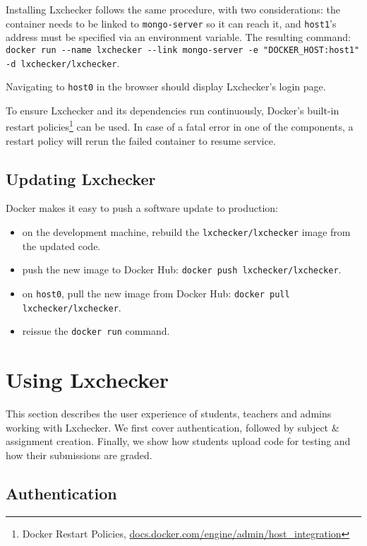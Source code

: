 Installing Lxchecker follows the same procedure, with two considerations: the container needs to be linked to \texttt{mongo-server} so it can reach it, and \texttt{host1}'s address must be specified via an environment variable. The resulting command: \texttt{docker run -{}-name lxchecker -{}-link mongo-server -e "DOCKER_HOST:host1" -d lxchecker/lxchecker}.

Navigating to \texttt{host0} in the browser should display Lxchecker's login page.

To ensure Lxchecker and its dependencies run continuously, Docker's built-in restart policies\footnote{Docker Restart Policies, \url{docs.docker.com/engine/admin/host_integration}} can be used. In case of a fatal error in one of the components, a restart policy will rerun the failed container to resume service.

\subsection{Updating Lxchecker}
\label{sub-sec:update-lxchecker}

Docker makes it easy to push a software update to production:
\begin{itemize}
	\item on the development machine, rebuild the \texttt{lxchecker/lxchecker} image from the updated code.
	\item push the new image to Docker Hub: \texttt{docker push lxchecker/lxchecker}.
	\item on \texttt{host0}, pull the new image from Docker Hub: \texttt{docker pull lxchecker/lxchecker}.
	\item reissue the \texttt{docker run} command.
\end{itemize}


\section{Using Lxchecker}
\label{sec:usage}

This section describes the user experience of students, teachers and admins working with Lxchecker. We first cover authentication, followed by subject \& assignment creation. Finally, we show how students upload code for testing and how their submissions are graded.

\subsection{Authentication}
\label{sub-sec:usage-authentication}

